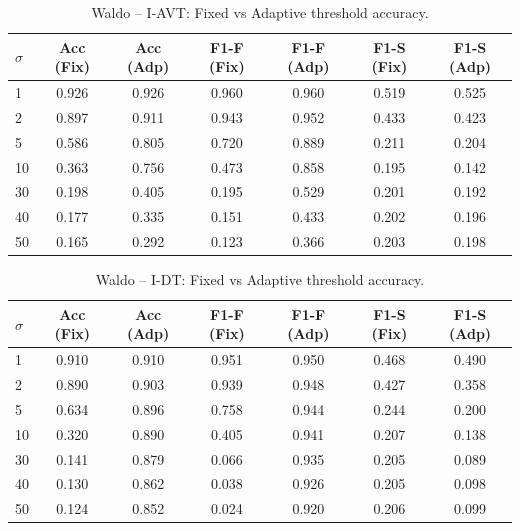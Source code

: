 \begin{table}[htb]
\centering
\caption{Waldo – I-AVT: Fixed vs Adaptive threshold accuracy.}
\label{tab:waldo_iavt}
\begin{tabular}{lcccccc}
\toprule
$\sigma$ & Acc (Fix) & Acc (Adp) & F1-F (Fix) & F1-F (Adp) & F1-S (Fix) & F1-S (Adp) \\
\midrule
1 & 0.926 & 0.926 & 0.960 & 0.960 & 0.519 & 0.525 \\
2 & 0.897 & 0.911 & 0.943 & 0.952 & 0.433 & 0.423 \\
5 & 0.586 & 0.805 & 0.720 & 0.889 & 0.211 & 0.204 \\
10 & 0.363 & 0.756 & 0.473 & 0.858 & 0.195 & 0.142 \\
30 & 0.198 & 0.405 & 0.195 & 0.529 & 0.201 & 0.192 \\
40 & 0.177 & 0.335 & 0.151 & 0.433 & 0.202 & 0.196 \\
50 & 0.165 & 0.292 & 0.123 & 0.366 & 0.203 & 0.198 \\
\bottomrule
\end{tabular}
\end{table}


\begin{table}[htb]
\centering
\caption{Waldo – I-DT: Fixed vs Adaptive threshold accuracy.}
\label{tab:waldo_idt}
\begin{tabular}{lcccccc}
\toprule
$\sigma$ & Acc (Fix) & Acc (Adp) & F1-F (Fix) & F1-F (Adp) & F1-S (Fix) & F1-S (Adp) \\
\midrule
1 & 0.910 & 0.910 & 0.951 & 0.950 & 0.468 & 0.490 \\
2 & 0.890 & 0.903 & 0.939 & 0.948 & 0.427 & 0.358 \\
5 & 0.634 & 0.896 & 0.758 & 0.944 & 0.244 & 0.200 \\
10 & 0.320 & 0.890 & 0.405 & 0.941 & 0.207 & 0.138 \\
30 & 0.141 & 0.879 & 0.066 & 0.935 & 0.205 & 0.089 \\
40 & 0.130 & 0.862 & 0.038 & 0.926 & 0.205 & 0.098 \\
50 & 0.124 & 0.852 & 0.024 & 0.920 & 0.206 & 0.099 \\
\bottomrule
\end{tabular}
\end{table}


